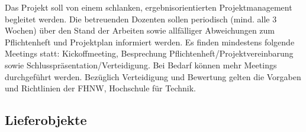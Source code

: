 Das Projekt soll von einem schlanken, ergebnisorientierten Projektmanagement begleitet werden. 
Die betreuenden Dozenten sollen periodisch (mind. alle 3 Wochen) über den Stand der Arbeiten sowie allfälliger Abweichungen zum Pflichtenheft und Projektplan informiert werden.
Es finden mindestens folgende Meetings statt: Kickoffmeeting, Besprechung Pflichtenheft/Projektvereinbarung sowie Schlusspräsentation/Verteidigung. 
Bei Bedarf können mehr Meetings durchgeführt werden.
Bezüglich Verteidigung und Bewertung gelten die Vorgaben und Richtlinien der FHNW, Hochschule für Technik.

\newpage

\subsection{Lieferobjekte}\label{subsec:Lieferobjekte}
